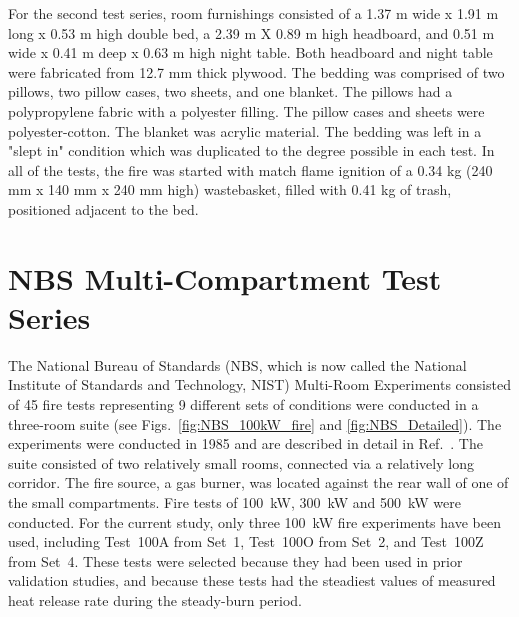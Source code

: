 For the second test series, room furnishings consisted of a 1.37 m wide x 1.91 m long x 0.53 m high double bed, a 2.39 m X 0.89 m high headboard, and 0.51 m wide x 0.41 m deep x 0.63 m high night table. Both headboard and night table were fabricated from 12.7 mm thick plywood. The bedding was comprised of two pillows, two pillow cases, two sheets, and one blanket. The pillows had a polypropylene fabric with a polyester filling. The pillow cases and sheets were polyester-cotton. The blanket was acrylic material. The bedding was left in a "slept in" condition which was duplicated to the degree possible in each test. In all of the tests, the fire was started with match flame ignition of a 0.34 kg (240 mm x 140 mm x 240 mm high) wastebasket, filled with 0.41 kg of trash, positioned adjacent to the bed.

\section{NBS Multi-Compartment Test Series}

The National Bureau of Standards (NBS, which is now called the National Institute of Standards and Technology, NIST) Multi-Room Experiments consisted of 45 fire tests representing 9 different sets of conditions were conducted in a three-room suite (see Figs.~\ref{fig:NBS_100kW_fire} and \ref{fig:NBS_Detailed}). The experiments were conducted in 1985 and are described in detail in Ref.~\cite{Peacock:1988}. The suite consisted of two relatively small rooms, connected via a relatively long corridor. The fire source, a gas burner, was located against the rear wall of one of the small compartments.  Fire tests of 100~kW, 300~kW and 500~kW were conducted. For the current study, only three 100~kW fire experiments have been used, including Test~100A from Set~1, Test~100O from Set~2, and Test~100Z from Set~4. These tests were selected because they had been used in prior validation studies, and because these tests had the steadiest values of measured heat release rate during the steady-burn period.

